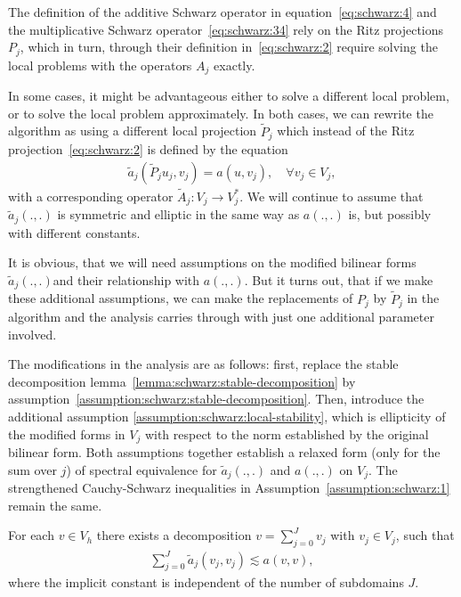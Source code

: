 \begin{remark}
  The definition of the additive Schwarz operator in
  equation~\eqref{eq:schwarz:4} and the multiplicative Schwarz
  operator~\eqref{eq:schwarz:34} rely on the Ritz projections $P_j$,
  which in turn, through their definition in~\eqref{eq:schwarz:2}
  require solving the local problems with the operators $A_j$ exactly.
  
  In some cases, it might be advantageous either to solve a different
  local problem, or to solve the local problem approximately. In both
  cases, we can rewrite the algorithm as using a different local
  projection $\widetilde P_j$ which instead of the Ritz
  projection~\eqref{eq:schwarz:2} is defined by the equation
  \begin{gather}
    \label{eq:schwarz:42}
    \widetilde a_j (\widetilde P_j u_j,v_j) = a(u,v_j),\quad\forall v_j\in V_j,
  \end{gather}
  with a corresponding operator $\widetilde A_j: V_j \to V_j^*$. We
  will continue to assume that $\widetilde a_j (.,.)$ is symmetric and
  elliptic in the same way as $a(.,.)$ is, but possibly with different
  constants.

  It is obvious, that we will need assumptions on the modified
  bilinear forms $\widetilde a_j (.,.)$and their relationship with
  $a(.,.)$. But it turns out, that if we make these additional
  assumptions, we can make the replacements of $P_j$ by $\widetilde
  P_j$ in the algorithm and the analysis carries through with just one
  additional parameter involved.
  
  The modifications in the analysis are as follows: first, replace the
  stable decomposition lemma~\ref{lemma:schwarz:stable-decomposition}
  by assumption~\ref{assumption:schwarz:stable-decomposition}. Then,
  introduce the additional assumption
  \ref{assumption:schwarz:local-stability}, which is ellipticity of
  the modified forms in $V_j$ with respect to the norm established by the
  original bilinear form. Both assumptions together establish a
  relaxed form (only for the sum over $j$) of spectral equivalence for
  $\widetilde a_j(.,.)$ and $a(.,.)$ on $V_j$. The strengthened
  Cauchy-Schwarz inequalities in Assumption~\ref{assumption:schwarz:1}
  remain the same.
\end{remark}

\begin{assumption}
  \label{assumption:schwarz:stable-decomposition}
    For each $v\in V_h$ there exists a decomposition $v=\sum_{j=0}^J
  v_j$ with $v_j\in V_j$, such that
  \begin{gather}
    \label{eq:schwarz:36}
    \sum_{j=0}^J \widetilde a_j(v_j, v_j)
    \lesssim a(v,v),
  \end{gather}
  where the implicit constant is independent of the number of
  subdomains $J$.
\end{assumption}

